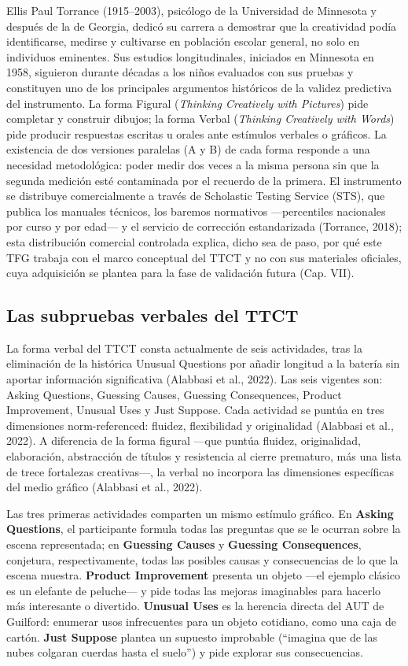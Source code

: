 \documentclass[12pt,twoside,titlepage]{report}
\begin{document}
Ellis Paul Torrance (1915--2003), psicólogo de la Universidad de Minnesota y después de la de Georgia, dedicó su carrera a demostrar que la creatividad podía identificarse, medirse y cultivarse en población escolar general, no solo en individuos eminentes. Sus estudios longitudinales, iniciados en Minnesota en 1958, siguieron durante décadas a los niños evaluados con sus pruebas y constituyen uno de los principales argumentos históricos de la validez predictiva del instrumento. La forma Figural (\textit{Thinking Creatively with Pictures}) pide completar y construir dibujos; la forma Verbal (\textit{Thinking Creatively with Words}) pide producir respuestas escritas u orales ante estímulos verbales o gráficos. La existencia de dos versiones paralelas (A y B) de cada forma responde a una necesidad metodológica: poder medir dos veces a la misma persona sin que la segunda medición esté contaminada por el recuerdo de la primera. El instrumento se distribuye comercialmente a través de Scholastic Testing Service (STS), que publica los manuales técnicos, los baremos normativos ---percentiles nacionales por curso y por edad--- y el servicio de corrección estandarizada (Torrance, 2018); esta distribución comercial controlada explica, dicho sea de paso, por qué este TFG trabaja con el marco conceptual del TTCT y no con sus materiales oficiales, cuya adquisición se plantea para la fase de validación futura (Cap. VII).

\subsection{Las subpruebas verbales del TTCT}

La forma verbal del TTCT consta actualmente de seis actividades, tras la eliminación de la histórica Unusual Questions por añadir longitud a la batería sin aportar información significativa (Alabbasi et al., 2022). Las seis vigentes son: Asking Questions, Guessing Causes, Guessing Consequences, Product Improvement, Unusual Uses y Just Suppose. Cada actividad se puntúa en tres dimensiones norm-referenced: fluidez, flexibilidad y originalidad (Alabbasi et al., 2022). A diferencia de la forma figural ---que puntúa fluidez, originalidad, elaboración, abstracción de títulos y resistencia al cierre prematuro, más una lista de trece fortalezas creativas---, la verbal no incorpora las dimensiones específicas del medio gráfico (Alabbasi et al., 2022).

Las tres primeras actividades comparten un mismo estímulo gráfico. En \textbf{Asking Questions}, el participante formula todas las preguntas que se le ocurran sobre la escena representada; en \textbf{Guessing Causes} y \textbf{Guessing Consequences}, conjetura, respectivamente, todas las posibles causas y consecuencias de lo que la escena muestra. \textbf{Product Improvement} presenta un objeto ---el ejemplo clásico es un elefante de peluche--- y pide todas las mejoras imaginables para hacerlo más interesante o divertido. \textbf{Unusual Uses} es la herencia directa del AUT de Guilford: enumerar usos infrecuentes para un objeto cotidiano, como una caja de cartón. \textbf{Just Suppose} plantea un supuesto improbable (``imagina que de las nubes colgaran cuerdas hasta el suelo'') y pide explorar sus consecuencias.
\end{document}
